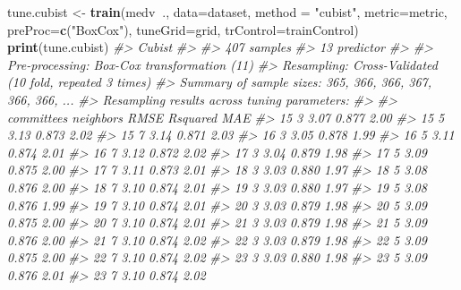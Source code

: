\documentclass[]{book}
\newenvironment{Shaded}{\begin{snugshade}}{\end{snugshade}}
\newcommand{\CommentTok}[1]{\textcolor[rgb]{0.56,0.35,0.01}{\textit{#1}}}
\newcommand{\DataTypeTok}[1]{\textcolor[rgb]{0.13,0.29,0.53}{#1}}
\newcommand{\KeywordTok}[1]{\textcolor[rgb]{0.13,0.29,0.53}{\textbf{#1}}}
\newcommand{\NormalTok}[1]{#1}
\newcommand{\OperatorTok}[1]{\textcolor[rgb]{0.81,0.36,0.00}{\textbf{#1}}}
\newcommand{\StringTok}[1]{\textcolor[rgb]{0.31,0.60,0.02}{#1}}
\begin{document}
\begin{Shaded}
\begin{Highlighting}[]
\NormalTok{tune.cubist <-}\StringTok{ }\KeywordTok{train}\NormalTok{(medv}\OperatorTok{~}\NormalTok{., }\DataTypeTok{data=}\NormalTok{dataset, }\DataTypeTok{method =} \StringTok{"cubist"}\NormalTok{, }\DataTypeTok{metric=}\NormalTok{metric, }
                     \DataTypeTok{preProc=}\KeywordTok{c}\NormalTok{(}\StringTok{"BoxCox"}\NormalTok{), }
                     \DataTypeTok{tuneGrid=}\NormalTok{grid, }\DataTypeTok{trControl=}\NormalTok{trainControl)}
\KeywordTok{print}\NormalTok{(tune.cubist)}
\CommentTok{#> Cubist }
\CommentTok{#> }
\CommentTok{#> 407 samples}
\CommentTok{#>  13 predictor}
\CommentTok{#> }
\CommentTok{#> Pre-processing: Box-Cox transformation (11) }
\CommentTok{#> Resampling: Cross-Validated (10 fold, repeated 3 times) }
\CommentTok{#> Summary of sample sizes: 365, 366, 366, 367, 366, 366, ... }
\CommentTok{#> Resampling results across tuning parameters:}
\CommentTok{#> }
\CommentTok{#>   committees  neighbors  RMSE  Rsquared  MAE }
\CommentTok{#>   15          3          3.07  0.877     2.00}
\CommentTok{#>   15          5          3.13  0.873     2.02}
\CommentTok{#>   15          7          3.14  0.871     2.03}
\CommentTok{#>   16          3          3.05  0.878     1.99}
\CommentTok{#>   16          5          3.11  0.874     2.01}
\CommentTok{#>   16          7          3.12  0.872     2.02}
\CommentTok{#>   17          3          3.04  0.879     1.98}
\CommentTok{#>   17          5          3.09  0.875     2.00}
\CommentTok{#>   17          7          3.11  0.873     2.01}
\CommentTok{#>   18          3          3.03  0.880     1.97}
\CommentTok{#>   18          5          3.08  0.876     2.00}
\CommentTok{#>   18          7          3.10  0.874     2.01}
\CommentTok{#>   19          3          3.03  0.880     1.97}
\CommentTok{#>   19          5          3.08  0.876     1.99}
\CommentTok{#>   19          7          3.10  0.874     2.01}
\CommentTok{#>   20          3          3.03  0.879     1.98}
\CommentTok{#>   20          5          3.09  0.875     2.00}
\CommentTok{#>   20          7          3.10  0.874     2.01}
\CommentTok{#>   21          3          3.03  0.879     1.98}
\CommentTok{#>   21          5          3.09  0.876     2.00}
\CommentTok{#>   21          7          3.10  0.874     2.02}
\CommentTok{#>   22          3          3.03  0.879     1.98}
\CommentTok{#>   22          5          3.09  0.875     2.00}
\CommentTok{#>   22          7          3.10  0.874     2.02}
\CommentTok{#>   23          3          3.03  0.880     1.98}
\CommentTok{#>   23          5          3.09  0.876     2.01}
\CommentTok{#>   23          7          3.10  0.874     2.02}

\end{Highlighting}
\end{Shaded}
\end{document}
